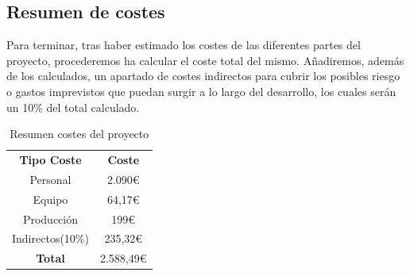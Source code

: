 \subsection{Resumen de costes}

Para terminar, tras haber estimado los costes de las diferentes partes del proyecto, procederemos ha calcular el coste total del mismo. Añadiremos, además de los calculados, un apartado de costes indirectos para cubrir los posibles riesgo o gastos imprevistos que puedan surgir a lo largo del desarrollo, los cuales serán un 10\% del total calculado.

\begin{table}[H]
	\begin{center}
		\begin{tabular}{| c | c |}
			\hline
			
			\textbf{Tipo Coste} & \textbf{Coste} \\
			Personal & 2.090€ \\
			Equipo & 64,17€ \\
			Producción & 199€ \\
			Indirectos(10\%) & 235,32€ \\
			\textbf{Total} & 2.588,49€ \\ \hline
		\end{tabular}
		\caption{Resumen costes del proyecto}
	\end{center}
\end{table}

 